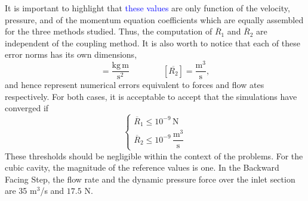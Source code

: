 \documentclass[final,3p,times,11pt,onecolumn]{myElsarticle}
\numberwithin{equation}{section}
\newcommand{\CIP}[1]{{\color{blue} #1}}
\begin{document}
It is important to highlight that \textcolor{blue}{these values} are only function of the velocity, pressure, and of the momentum equation coefficients which are equally assembled for the three methods studied. Thus, the computation of $\overline{R}_1$ and $\overline{R}_2$ are independent of the coupling method. It is also worth to notice that each of these error norms has its own dimensions,%
\begin{equation}
[\overline{R_1}]
=
\frac{\text{kg}\,\text{m}}{\text{s}^2}
\qquad \qquad
[\overline{R_2}]
=
\frac{\text{m}^3}{\text{s}},
\end{equation}
and hence represent numerical errors equivalent to forces and flow ates respectively. For both cases, it is acceptable to accept that the simulations have converged if
\begin{equation} \label{Eq:convergencecriterion}
\left\lbrace
\begin{array}{c}
\overline{R}_1 \leq 10^{-9}\, \text{N} \\
\overline{R}_2 \leq 10^{-9}\,
\dfrac{\text{m}^3}{\text{s}}
\end{array}
\right.
\end{equation}
These thresholds should be negligible within the context of the problems. For the cubic cavity, the magnitude of the reference values is one. In the Backward Facing Step, the flow rate and the dynamic pressure force over the inlet section are 35 m$^3$/s and $17.5$ N.


\end{document}
